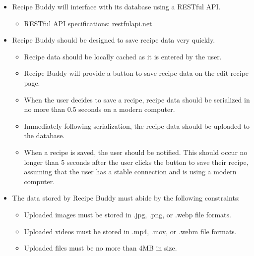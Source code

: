 \documentclass{scrreprt}
\begin{document}
\begin{itemize}
\begin{itemize}
    \end{itemize}


    \item \gls{Recipe Buddy} will interface with its database using a \gls{RESTful API}.
    \begin{itemize}

        \item \gls{RESTful API} specifications: \href{https://restfulapi.net/}{restfulapi.net}
    
    \end{itemize}

    \item \gls{Recipe Buddy} should be designed to save recipe data very quickly.
    \begin{itemize}

        \item Recipe data should be locally cached as it is entered by the user.
        \item \gls{Recipe Buddy} will provide a button to save recipe data on the edit recipe page.
        \item When the user decides to save a recipe, recipe data should be \gls{serialized} in no more than 0.5 seconds on a modern computer.
        \item Immediately following \gls{serialization}, the recipe data should be uploaded to the database.
        \item When a recipe is saved, the user should be notified. This should occur no longer than 5 seconds after the user clicks the button to save their recipe, assuming that the user has a stable connection and is using a modern computer.

    \end{itemize}

    \item The data stored by \gls{Recipe Buddy} must abide by the following constraints:
    \begin{itemize}

        \item Uploaded images must be stored in .jpg, .png, or .webp file formats.
        \item Uploaded videos must be stored in .mp4, .mov, or .webm file formats.
        \item Uploaded files must be no more than 4MB in size.

    \end{itemize}

\end{itemize}
\end{document}
